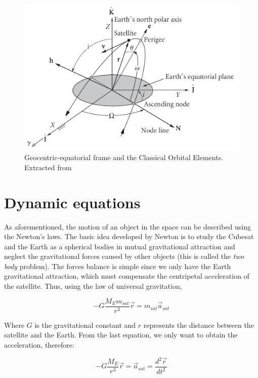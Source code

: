 \begin{figure}[H]
\centering
\includegraphics[scale=.3]{./Geometry/fig-Ch1-Geometry/COE.png}
\caption[Geocentric-equatorial frame and the Classical Orbital Elements]{Geocentric-equatorial frame and the Classical Orbital Elements. Extracted from \cite{Curtis2010}}
\label{fig:COE}
\end{figure}

\section{Dynamic equations}
As aforementioned, the motion of an object in the space can be described using the Newton's laws. The basic idea developed by Newton is to study the Cubesat and the Earth as a spherical bodies in mutual gravitational attraction and neglect the gravitational forces caused by other objects (this is called the \textit{two body} problem). The forces balance is simple since we only have the Earth gravitational attraction, which must compensate the centripetal acceleration of the satellite. Thus, using the law of universal gravitation,

\begin{equation}
-G\frac{M_{E}m_{sat}}{r^3}\vec{r}=m_{sat}\vec{a}_{sat}
\end{equation}

Where $G$ is the gravitational constant and $r$ represents the distance between the satellite and the Earth. From the last equation, we only want to obtain the acceleration, therefore:

\begin{equation}
-G\frac{M_{E}}{r^3}\vec{r}=\vec{a}_{sat}=\frac{d^2 \vec{r}}{d t^2}
\end{equation}

